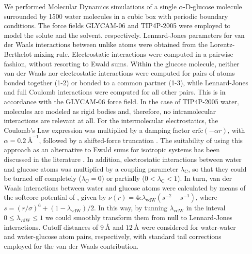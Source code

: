 \documentclass[journal=jctcce,manuscript=article,layout=twocolumn]{achemso}
\begin{document}
We performed Molecular Dynamics simulations of a single $\alpha$-D-glucose molecule surrounded by 1500 water molecules in a cubic box with periodic boundary conditions. The force fields GLYCAM-06 \cite{Kirschner_2007} and TIP4P-2005 \cite{Abascal_2005} were employed to model the solute and the solvent, respectively. Lennard-Jones parameters for van der Waals interactions between unlike atoms were obtained from the Lorentz-Berthelot mixing rule. Electrostatic interactions were computed in a pairwise fashion, without resorting to Ewald sums. Within the glucose molecule, neither van der Waals nor electrostatic interactions were computed for pairs of atoms bonded together (1-2) or bonded to a common partner (1-3), while Lennard-Jones and full Coulomb interactions were computed for all other pairs. This is in accordance with the GLYCAM-06 \cite{Kirschner_2007} force field. In the case of TIP4P-2005 \cite{Abascal_2005} water, molecules are modeled as rigid bodies and, therefore, no intramolecular interactions are relevant at all. For the intermolecular electrostatics, the Coulomb's Law expression was multiplied by a damping factor $\text{erfc}(-\alpha r)$, with $\alpha = 0.2~\text{\AA}^{-1}$, followed by a shifted-force truncation \cite{Allen_1987}. The suitability of using this approach as an alternative to Ewald sums for isotropic systems has been discussed in the literature \cite{Fennell_2006}. In addition, electrostatic interactions between water and glucose atoms was multiplied by a coupling parameter $\lambda_\text{C}$, so that they could be turned off completely ($\lambda_\text{C} = 0$) or partially ($0 < \lambda_\text{C} < 1$). In turn, van der Waals interactions between water and glucose atoms were calculated by means of the softcore potential of \citeauthor{Beutler_1994} \cite{Beutler_1994}, given by $\nu(r) = 4\epsilon\lambda_\text{vdW}(s^{-2} - s^{-1})$, where $s = (r/\sigma)^6 + (1-\lambda_\text{vdW})/2$. In this way, by tunning $\lambda_\text{vdW}$ in the inteval $0 \le \lambda_\text{vdW} \le 1$ we could smoothly transform them from null to Lennard-Jones interactions. Cutoff distances of $9~\text{\AA}$ and $12~\text{\AA}$ were considered for water-water and water-glucose atom pairs, respectively, with standard tail corrections employed for the van der Waals contribution.
\end{document}
